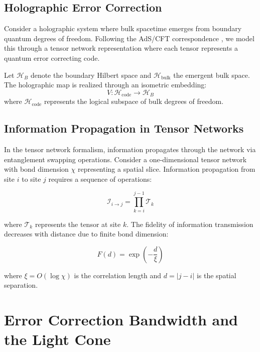 \documentclass[12pt]{article}
\begin{document}
\subsection{Holographic Error Correction}

Consider a holographic system where bulk spacetime emerges from boundary quantum degrees of freedom. Following the AdS/CFT correspondence \cite{Maldacena1998}, we model this through a tensor network representation where each tensor represents a quantum error correcting code.

Let $\mathcal{H}_B$ denote the boundary Hilbert space and $\mathcal{H}_{\text{bulk}}$ the emergent bulk space. The holographic map is realized through an isometric embedding:
\begin{equation}
V: \mathcal{H}_{\text{code}} \rightarrow \mathcal{H}_B
\end{equation}
where $\mathcal{H}_{\text{code}}$ represents the logical subspace of bulk degrees of freedom.

\subsection{Information Propagation in Tensor Networks}

In the tensor network formalism, information propagates through the network via entanglement swapping operations. Consider a one-dimensional tensor network with bond dimension $\chi$ representing a spatial slice. Information propagation from site $i$ to site $j$ requires a sequence of operations:

\begin{equation}
\mathcal{I}_{i \rightarrow j} = \prod_{k=i}^{j-1} \mathcal{T}_k
\end{equation}

where $\mathcal{T}_k$ represents the tensor at site $k$. The fidelity of information transmission decreases with distance due to finite bond dimension:

\begin{equation}
F(d) = \exp\left(-\frac{d}{\xi}\right)
\end{equation}

where $\xi = O(\log \chi)$ is the correlation length and $d = |j-i|$ is the spatial separation.

\section{Error Correction Bandwidth and the Light Cone}
\end{document}
